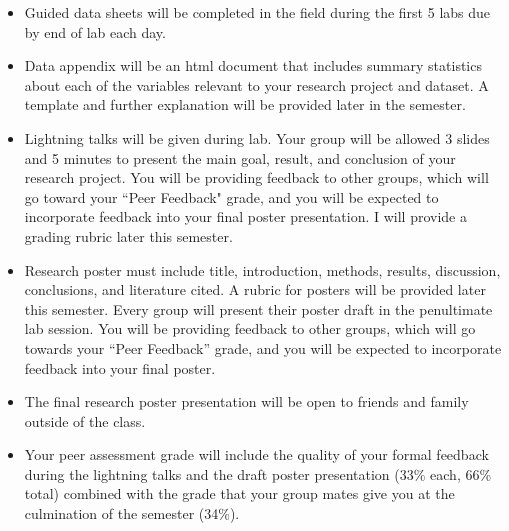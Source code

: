 \documentclass{tufte-handout}
\begin{document}
\begin{fullwidth}
\begin{itemize}
\item Guided data sheets will be completed in the field during the first 5 labs due by end of lab each day. %
\item Data appendix will be an html document that includes summary statistics about each of the variables relevant to your research project and dataset. A template and further explanation will be provided later in the semester. 
\item Lightning talks will be given during lab. Your group will be allowed 3 slides and 5 minutes to present the main goal, result, and conclusion of your research project. You will be providing feedback to other groups, which will go toward your ``Peer Feedback" grade, and you will be expected to incorporate feedback into your final poster presentation. I will provide a grading rubric later this semester.
\item Research poster must include title, introduction, methods, results, discussion, conclusions, and literature cited. A rubric for posters will be provided later this semester. Every group will present their poster draft in the penultimate lab session. You will be providing feedback to other groups, which will go towards your ``Peer Feedback'' grade, and you will be expected to incorporate feedback into your final poster. 
\item The final research poster presentation will be open to friends and family outside of the class.
\item Your peer assessment grade will include the quality of your formal feedback during the lightning talks and the draft poster presentation (33\% each, 66\% total) combined with the grade that your group mates give you at the culmination of the semester (34\%). 
\end{itemize}









\end{fullwidth}
\end{document}
